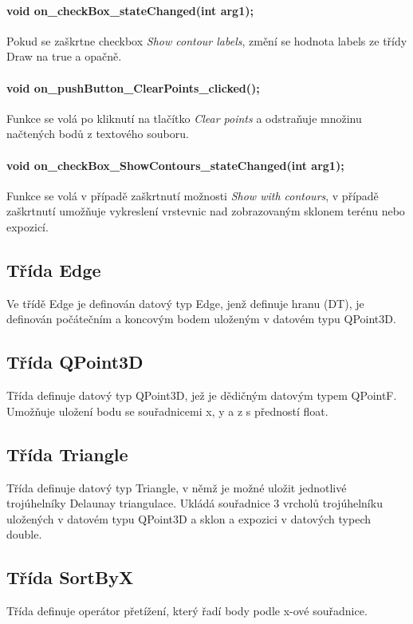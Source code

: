 \documentclass[11pt]{article}
\begin{document}
\paragraph {void on\_checkBox\_stateChanged(int arg1);}
Pokud se zaškrtne checkbox \textit{Show contour labels}, změní se hodnota labels ze třídy Draw na true a opačně.

\paragraph {void on\_pushButton\_ClearPoints\_clicked();}
Funkce se volá po kliknutí na tlačítko \textit{\textit{Clear points}} a odstraňuje množinu načtených bodů z textového souboru.

\paragraph {void on\_checkBox\_ShowContours\_stateChanged(int arg1);}
Funkce se volá v případě zaškrtnutí možnosti \textit{Show with contours}, v případě zaškrtnutí umožňuje vykreslení vrstevnic nad zobrazovaným sklonem terénu nebo expozicí.

\subsection{Třída Edge}
Ve třídě Edge je definován datový typ Edge, jenž definuje hranu (DT), je definován počátečním a koncovým bodem uloženým v datovém typu QPoint3D.

\subsection{Třída QPoint3D}
Třída definuje datový typ QPoint3D, jež je dědičným datovým typem QPointF. Umožňuje uložení bodu se souřadnicemi x, y a z s předností float.

\subsection{Třída Triangle}
Třída definuje datový typ Triangle, v němž je možné uložit jednotlivé trojúhelníky Delaunay triangulace. Ukládá souřadnice 3 vrcholů trojúhelníku uložených v datovém typu QPoint3D a sklon a expozici v datových typech double.

\subsection{Třída SortByX}
Třída definuje operátor přetížení, který řadí body podle x-ové souřadnice.
\end{document}
